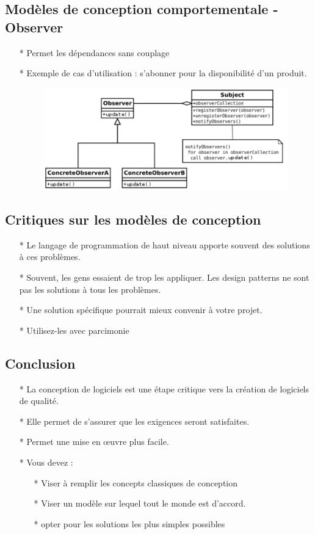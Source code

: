 \documentclass[12pt]{article}
\begin{document}
\subsection{Modèles de conception comportementale - Observer}
\begin{itemize}
	\item[* ] Permet les dépendances sans
	couplage
	\item[* ] Exemple de cas d'utilisation : s'abonner
	pour la disponibilité d'un produit.
	\begin{figure}[!hbtp]
		\centering
		\includegraphics[scale=0.75]{Capture4.PNG}
	\end{figure}
\end{itemize}
\subsection{Critiques sur les modèles de conception}
\begin{itemize}
	\item[* ] Le langage de programmation de haut niveau apporte souvent des solutions à ces problèmes.
	\item[* ] Souvent, les gens essaient de trop les appliquer. Les design patterns ne sont pas les
	solutions à tous les problèmes.
	\item[* ] Une solution spécifique pourrait mieux convenir à votre projet.
	\item[* ] Utilisez-les avec parcimonie
\end{itemize}
\subsection{Conclusion}
\begin{itemize}
	\item[* ] La conception de logiciels est une étape critique vers la création de logiciels de qualité.
	\item[* ] Elle permet de s'assurer que les exigences seront satisfaites.
	\item[* ] Permet une mise en œuvre plus facile.
	\item[* ] Vous devez :
	\begin{itemize}
		\item[* ] Viser à remplir les concepts classiques de conception
		\item[* ] Viser un modèle sur lequel tout le monde est d'accord.
		\item[* ] opter pour les solutions les plus simples possibles
	\end{itemize}
\end{itemize}
\end{document}
